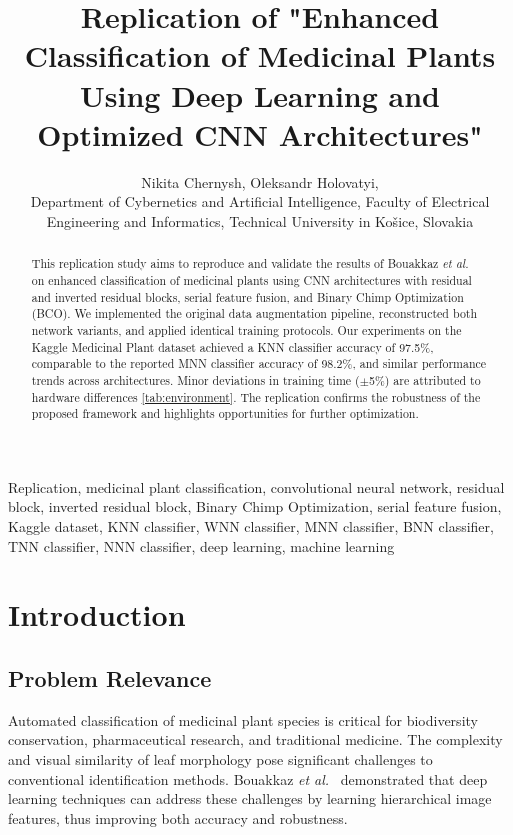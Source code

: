 \documentclass[journal,onecolumn]{IEEEtran}
\begin{document}
\title{Replication of "Enhanced Classification of Medicinal Plants Using Deep Learning and Optimized CNN Architectures"}

\author{Nikita Chernysh, Oleksandr Holovatyi, \\
Department of Cybernetics and Artificial Intelligence, Faculty of Electrical Engineering and Informatics, Technical University in Košice, Slovakia}

\maketitle

\begin{abstract}
    This replication study aims to reproduce and validate the results of Bouakkaz \textit{et al.}~\cite{Bouakkaz2025} on enhanced classification of medicinal plants using CNN architectures with residual and inverted residual blocks, serial feature fusion, and Binary Chimp Optimization (BCO). We implemented the original data augmentation pipeline, reconstructed both network variants, and applied identical training protocols. Our experiments on the Kaggle Medicinal Plant dataset achieved a KNN classifier accuracy of 97.5\%, comparable to the reported MNN classifier accuracy of 98.2\%, and similar performance trends across architectures. Minor deviations in training time (\ensuremath{\pm}5\%) are attributed to hardware differences \ref{tab:environment}. The replication confirms the robustness of the proposed framework and highlights opportunities for further optimization.
    \end{abstract}
    
\begin{IEEEkeywords}
Replication, medicinal plant classification, convolutional neural network, residual block, inverted residual block, Binary Chimp Optimization, serial feature fusion, Kaggle dataset, KNN classifier, WNN classifier, MNN classifier, BNN classifier, TNN classifier, NNN classifier, deep learning, machine learning
\end{IEEEkeywords}


\section{Introduction}
\subsection{Problem Relevance}
Automated classification of medicinal plant species is critical for biodiversity conservation, pharmaceutical research, and traditional medicine. The complexity and visual similarity of leaf morphology pose significant challenges to conventional identification methods. Bouakkaz \textit{et al.}~\cite{Bouakkaz2025} demonstrated that deep learning techniques can address these challenges by learning hierarchical image features, thus improving both accuracy and robustness.
\end{document}
